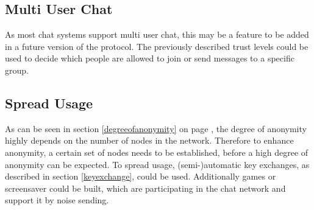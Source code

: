 \subsection{Multi User Chat}
As most chat systems support multi user chat, this may be a feature to be added
in a future version of the protocol. The previously described trust levels
could be used to decide which people are allowed to join or send messages
to a specific group.
\subsection{Spread Usage}
As can be seen in section \ref{degreeofanonymity} on page \pageref{degreeofanonymity},
the degree of anonymity highly depends on the number of nodes in the network.
Therefore to enhance anonymity, a certain set of nodes needs to be established,
before a high degree of anonymity can be expected.
To spread usage, (semi-)automatic key exchanges, as described
in section \ref{keyexchange}, could be used. Additionally 
games or screensaver could be built, which are participating in the
chat network and support it by noise sending.
